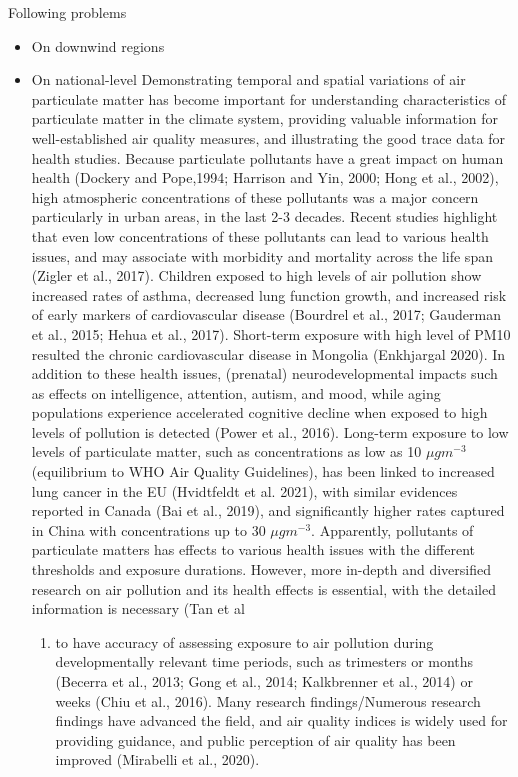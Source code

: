 \documentclass[
  11pt,
]{article}
\providecommand{\tightlist}{%
  \setlength{\itemsep}{0pt}\setlength{\parskip}{0pt}}
\begin{document}
Following problems

\begin{itemize}
\tightlist
\item
  On downwind regions
\item
  On national-level Demonstrating temporal and spatial variations of air
  particulate matter has become important for understanding
  characteristics of particulate matter in the climate system, providing
  valuable information for well-established air quality measures, and
  illustrating the good trace data for health studies. Because
  particulate pollutants have a great impact on human health (Dockery
  and Pope,1994; Harrison and Yin, 2000; Hong et al., 2002), high
  atmospheric concentrations of these pollutants was a major concern
  particularly in urban areas, in the last 2-3 decades. Recent studies
  highlight that even low concentrations of these pollutants can lead to
  various health issues, and may associate with morbidity and mortality
  across the life span (Zigler et al., 2017). Children exposed to high
  levels of air pollution show increased rates of asthma, decreased lung
  function growth, and increased risk of early markers of cardiovascular
  disease (Bourdrel et al., 2017; Gauderman et al., 2015; Hehua et al.,
  2017). Short-term exposure with high level of PM10 resulted the
  chronic cardiovascular disease in Mongolia (Enkhjargal 2020). In
  addition to these health issues, (prenatal) neurodevelopmental impacts
  such as effects on intelligence, attention, autism, and mood, while
  aging populations experience accelerated cognitive decline when
  exposed to high levels of pollution is detected (Power et al., 2016).
  Long-term exposure to low levels of particulate matter, such as
  concentrations as low as 10 \(\mu g m^{-3}\) (equilibrium to WHO Air
  Quality Guidelines), has been linked to increased lung cancer in the
  EU (Hvidtfeldt et al. 2021), with similar evidences reported in Canada
  (Bai et al., 2019), and significantly higher rates captured in China
  with concentrations up to 30 \(\mu g m^{-3}\). Apparently, pollutants
  of particulate matters has effects to various health issues with the
  different thresholds and exposure durations. However, more in-depth
  and diversified research on air pollution and its health effects is
  essential, with the detailed information is necessary (Tan et al

  \begin{enumerate}
  \def\labelenumi{\arabic{enumi})}
  \setcounter{enumi}{2020}
  \tightlist
  \item
    to have accuracy of assessing exposure to air pollution during
    developmentally relevant time periods, such as trimesters or months
    (Becerra et al., 2013; Gong et al., 2014; Kalkbrenner et al., 2014)
    or weeks (Chiu et al., 2016). Many research findings/Numerous
    research findings have advanced the field, and air quality indices
    is widely used for providing guidance, and public perception of air
    quality has been improved (Mirabelli et al., 2020).
  \end{enumerate}
\end{itemize}
\end{document}
